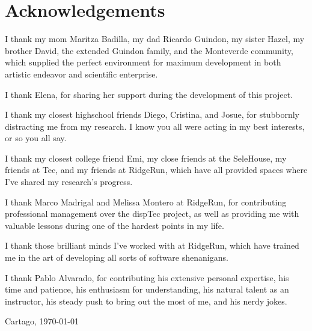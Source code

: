 \chapter*{Acknowledgements}
\thispagestyle{empty}

I thank my mom Maritza Badilla, my dad Ricardo Guindon, my sister Hazel, my brother David, the extended Guindon family, and the Monteverde community, which supplied the perfect environment for maximum development in both artistic endeavor and scientific enterprise.

I thank Elena, for sharing her support during the development of this project.

I thank my closest highschool friends Diego, Cristina, and Josue, for stubbornly distracting me from my research. I know you all were acting in my best interests, or so you all say.

I thank my closest college friend Emi, my close friends at the SeleHouse, my friends at Tec, and my friends at RidgeRun, which have all provided spaces where I've shared my research's progress.

I thank Marco Madrigal and Melissa Montero at RidgeRun, for contributing professional management over the dispTec project, as well as providing me with valuable lessons during one of the hardest points in my life.

I thank those brilliant minds I've worked with at RidgeRun, which have trained me in the art of developing all sorts of software shenanigans.

I thank Pablo Alvarado, for contributing his extensive personal expertise, his time and patience, his enthusiasm for understanding, his natural talent as an instructor, his steady push to bring out the most of me, and his nerdy jokes.

\vspace*{1cm}

\thesisAuthor

Cartago, \today

\cleardoublepage

